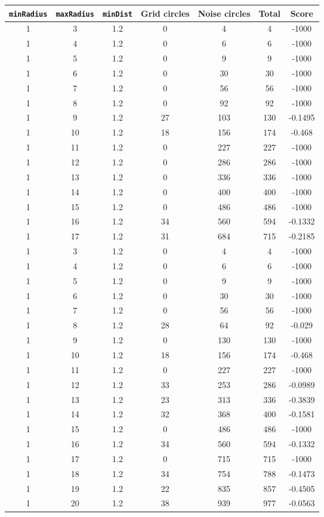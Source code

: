\documentclass[letterpaper, 12pt]{article}
\begin{document}
\begin{longtable}{|c|c|c|c|c|c|c|}
\hline
\textbf{\texttt{minRadius}} & \textbf{\texttt{maxRadius}} & \textbf{\texttt{minDist}} & \textbf{Grid circles} & \textbf{Noise circles} & \textbf{Total} & \textbf{Score} \\
\hline
1 & 3 & 1.2 & 0 & 4 & 4 & -1000 \\
\hline
1 & 4 & 1.2 & 0 & 6 & 6 & -1000 \\
\hline
1 & 5 & 1.2 & 0 & 9 & 9 & -1000 \\
\hline
1 & 6 & 1.2 & 0 & 30 & 30 & -1000 \\
\hline
1 & 7 & 1.2 & 0 & 56 & 56 & -1000 \\
\hline
1 & 8 & 1.2 & 0 & 92 & 92 & -1000 \\
\hline
1 & 9 & 1.2 & 27 & 103 & 130 & -0.1495 \\
\hline
1 & 10 & 1.2 & 18 & 156 & 174 & -0.468 \\
\hline
1 & 11 & 1.2 & 0 & 227 & 227 & -1000 \\
\hline
1 & 12 & 1.2 & 0 & 286 & 286 & -1000 \\
\hline
1 & 13 & 1.2 & 0 & 336 & 336 & -1000 \\
\hline
1 & 14 & 1.2 & 0 & 400 & 400 & -1000 \\
\hline
1 & 15 & 1.2 & 0 & 486 & 486 & -1000 \\
\hline
1 & 16 & 1.2 & 34 & 560 & 594 & -0.1332 \\
\hline
1 & 17 & 1.2 & 31 & 684 & 715 & -0.2185 \\
\hline
1 & 3 & 1.2 & 0 & 4 & 4 & -1000 \\
\hline
1 & 4 & 1.2 & 0 & 6 & 6 & -1000 \\
\hline
1 & 5 & 1.2 & 0 & 9 & 9 & -1000 \\
\hline
1 & 6 & 1.2 & 0 & 30 & 30 & -1000 \\
\hline
1 & 7 & 1.2 & 0 & 56 & 56 & -1000 \\
\hline
1 & 8 & 1.2 & 28 & 64 & 92 & -0.029 \\
\hline
1 & 9 & 1.2 & 0 & 130 & 130 & -1000 \\
\hline
1 & 10 & 1.2 & 18 & 156 & 174 & -0.468 \\
\hline
1 & 11 & 1.2 & 0 & 227 & 227 & -1000 \\
\hline
1 & 12 & 1.2 & 33 & 253 & 286 & -0.0989 \\
\hline
1 & 13 & 1.2 & 23 & 313 & 336 & -0.3839 \\
\hline
1 & 14 & 1.2 & 32 & 368 & 400 & -0.1581 \\
\hline
1 & 15 & 1.2 & 0 & 486 & 486 & -1000 \\
\hline
1 & 16 & 1.2 & 34 & 560 & 594 & -0.1332 \\
\hline
1 & 17 & 1.2 & 0 & 715 & 715 & -1000 \\
\hline
1 & 18 & 1.2 & 34 & 754 & 788 & -0.1473 \\
\hline
1 & 19 & 1.2 & 22 & 835 & 857 & -0.4505 \\
\hline
1 & 20 & 1.2 & 38 & 939 & 977 & -0.0563 \\
\hline
\end{longtable}
\end{document}
